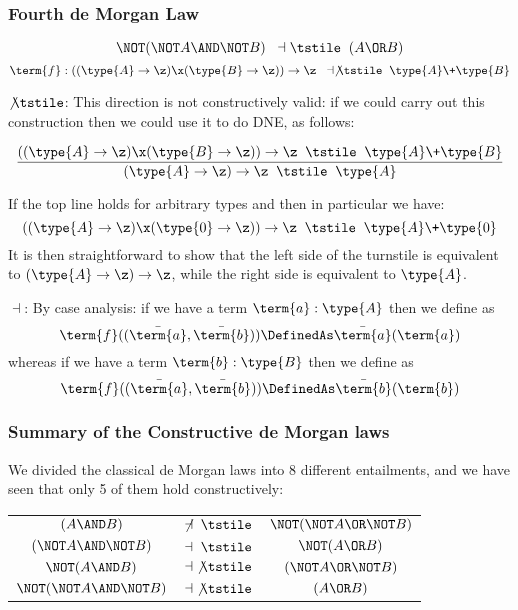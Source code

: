 \subsubsection{Fourth de Morgan Law}
\begin{Theorem}
\[
\NOT (\NOT A \AND \NOT B)
\;\;\dashv \tstile\;\;
(A \OR B)
\]
\[
\term{f}:((\type{A} \to \z) \x (\type{B} \to \z)) \to \z
\;\;\dashv \not\tstile \;\;
\type{A} \+ \type{B}
\]
\end{Theorem}
\begin{Proof}
$\not\tstile$: This direction is not constructively valid: if we could carry out this construction then we could use it to do DNE, as follows:
\begin{Lemma}
\[
\frac{
((\type{A} \to \z) \x (\type{B} \to \z)) \to \z
\;\;\tstile \;\;
\type{A} \+ \type{B}
}{
(\type{A} \to \z) \to \z
\;\;\tstile\;\;
\type{A}
}
\]
\end{Lemma}
\begin{Proof}
If the top line holds for arbitrary types  and  then in particular we have:
\[
((\type{A} \to \z) \x (\type{0} \to \z)) \to \z
\;\;\tstile \;\;
\type{A} \+ \type{0}
\]
It is then straightforward to show that the left side of the turnstile is equivalent to $(\type{A} \to \z) \to \z$, while the right side is equivalent to $\type{A}$.
\end{Proof}

$\dashv$:  By case analysis: if we have a term $\term{a}:\type{A}$ then we define  as
\[
\term{f}((\bar{\term{a}}, \bar{\term{b}})) \DefinedAs \bar{\term{a}}(\term{a})
\]
whereas if we have a term $\term{b}:\type{B}$ then we define  as
\[
\term{f}((\bar{\term{a}}, \bar{\term{b}})) \DefinedAs \bar{\term{b}}(\term{b})
\]

\end{Proof}


\subsubsection{Summary of the Constructive de Morgan laws}

We divided the classical de Morgan laws into 8 different entailments, and we have seen that only 5 of them hold constructively:

\begin{table}[h]
\centering
\begin{tabular}{c c c }
$(A \AND B)$					&$\not\dashv \; \tstile$ 	&$\NOT(\NOT A \OR \NOT B)$ \\
$(\NOT A \AND \NOT B)$ 	 	&$\dashv \; \tstile$ 	&$\NOT(A \OR B)$ \\
$\NOT(A \AND B)$  				&$\dashv \; \not\tstile$ 	&$(\NOT A \OR \NOT B)$ \\
$\NOT (\NOT A \AND \NOT B)$	&$\dashv \; \not\tstile$ 	&$(A \OR B)$
\end{tabular}
\end{table}

